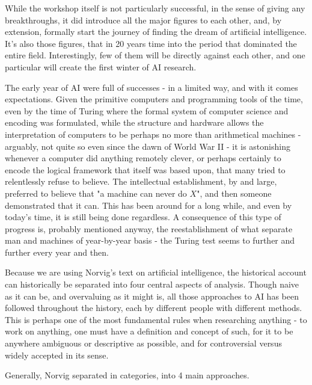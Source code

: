 While the workshop itself is not particularly successful, in the sense of giving any breakthroughs, it did introduce all the major figures to each other, and, by extension, formally start the journey of finding the dream of artificial intelligence. It's also those figures, that in 20 years time into the period that dominated the entire field. Interestingly, few of them will be directly against each other, and one particular will create the first winter of AI research. 

The early year of AI were full of successes - in a limited way, and with it comes expectations. Given the primitive computers and programming tools of the time, even by the time of Turing where the formal system of computer science and encoding was formulated, while the structure and hardware allows the interpretation of computers to be perhaps no more than arithmetical machines - arguably, not quite so even since the dawn of World War II - it is astonishing whenever a computer did anything remotely clever, or perhaps certainly to encode the logical framework that itself was based upon, that many tried to relentlessly refuse to believe. The intellectual establishment, by and large, preferred to believe that "a machine can never do $X$", and then someone demonstrated that it can. This has been around for a long while, and even by today's time, it is still being done regardless. A consequence of this type of progress is, probably mentioned anyway, the reestablishment of what separate man and machines of year-by-year basis - the Turing test seems to further and further every year and then. 

Because we are using Norvig's text on artificial intelligence, the historical account can historically be separated into four central aspects of analysis. Though naive as it can be, and overvaluing as it might is, all those approaches to AI has been followed throughout the history, each by different people with different methods. This is perhaps one of the most fundamental rules when researching anything - to work on anything, one must have a definition and concept of such, for it to be anywhere ambiguous or descriptive as possible, and for controversial versus widely accepted in its sense. 

    Generally, Norvig \cite{10.5555/1671238} separated in categories, into 4 main approaches. 


